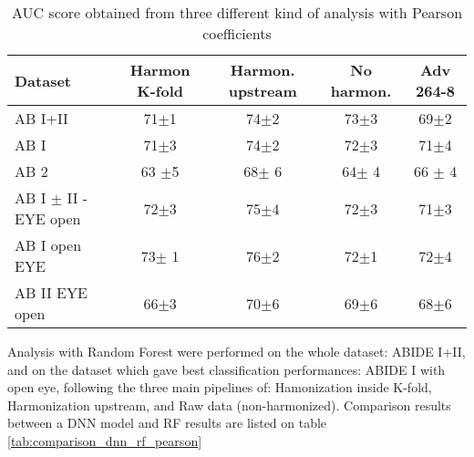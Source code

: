 \documentclass[a4paper,11pt]{article}
\begin{document}
\begin{table}[!htp]\centering
\scriptsize
\begin{tabular}{lcccc}\toprule
Dataset &Harmon K-fold &Harmon. upstream &No harmon. &Adv 264-8 \\\midrule
AB I+II &71$\pm$1 &74$\pm$2 &73$\pm$3 &69$\pm$2 \\
AB I &71$\pm$3 &74$\pm$2 &72$\pm$3 &71$\pm$4 \\
AB 2 &63 $\pm$5 &68$\pm$ 6 &64$\pm$ 4 &66 $\pm$ 4 \\
AB I $\pm$ II - EYE open &72$\pm$3 &75$\pm$4 &72$\pm$3 &71$\pm$3 \\
AB I open EYE &73$\pm$ 1 &76$\pm$2 &72$\pm$1 &72$\pm$4 \\
AB II EYE open &66$\pm$3 &70$\pm$6 &69$\pm$6 &68$\pm$6 \\
\bottomrule
\end{tabular}
\caption{AUC score obtained from three different kind of analysis with Pearson coefficients}
\label{tab:pearson_results}
\end{table}


Analysis with Random Forest were performed on the whole dataset: ABIDE I+II, and on the dataset which gave best classification performances: ABIDE I with open eye, following the three main pipelines of: Hamonization inside K-fold, Harmonization upstream, and Raw data (non-harmonized).
Comparison results between a DNN model and RF results are listed on table \ref{tab:comparison_dnn_rf_pearson}
\end{document}

